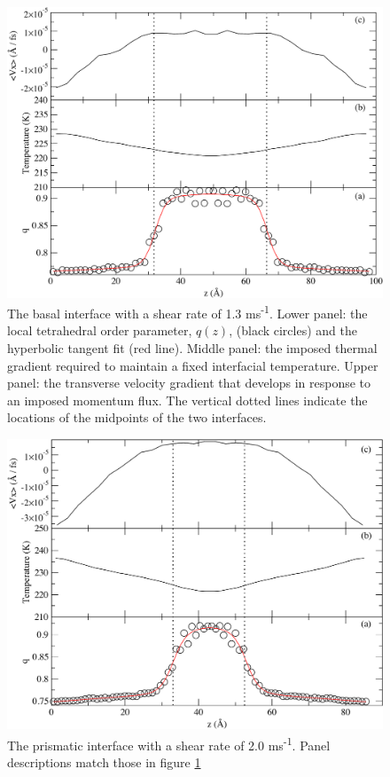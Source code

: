 \documentclass[11pt]{article}
\begin{document}
\begin{doublespace}
\begin{figure}
\includegraphics[width=\linewidth]{bComicStrip}
\caption{\label{fig:bComic} The basal interface with a shear rate of
  1.3 ms\textsuperscript{-1}.  Lower panel: the local tetrahedral order parameter, $q(z)$,
  (black circles) and the hyperbolic tangent fit (red line).  Middle
  panel: the imposed thermal gradient required to maintain a fixed
  interfacial temperature.  Upper panel: the transverse velocity
  gradient that develops in response to an imposed momentum flux.  The
  vertical dotted lines indicate the locations of the midpoints of the
  two interfaces.}
\end{figure}

\begin{figure}
\includegraphics[width=\linewidth]{pComicStrip}
\caption{\label{fig:pComic} The prismatic interface with a shear rate
  of 2.0 ms\textsuperscript{-1}.  Panel
  descriptions match those in figure \ref{fig:bComic}}
\end{figure}


\end{doublespace}
\end{document}
